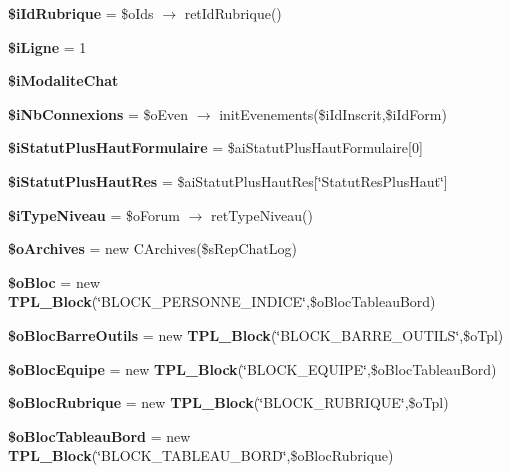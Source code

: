 \begin{CompactItemize}
\item 
\textbf{\$iIdRubrique} = \$oIds $\rightarrow$ retIdRubrique()\label{tableau__bord_8php_7e7c4458a7909f5b5d70084de05a2d8c}

\item 
\textbf{\$iLigne} = 1\label{tableau__bord_8php_fcbf9ca101fdc3384d3803689d92e4e4}

\item 
\textbf{\$iModaliteChat}
\item 
\textbf{\$iNbConnexions} = \$oEven $\rightarrow$ initEvenements(\$iIdInscrit,\$iIdForm)\label{tableau__bord_8php_7ac24b12bd0d7e2cf151eaf282f806c6}

\item 
\textbf{\$iStatutPlusHautFormulaire} = \$aiStatutPlusHautFormulaire[0]\label{tableau__bord_8php_92d4b8ea89f93a7fdb8f1607d749599f}

\item 
\textbf{\$iStatutPlusHautRes} = \$aiStatutPlusHautRes[\char`\"{}StatutResPlusHaut\char`\"{}]\label{tableau__bord_8php_24aae0e27da3a6d4263dd97eef6c88c9}

\item 
\textbf{\$iTypeNiveau} = \$oForum $\rightarrow$ retTypeNiveau()\label{tableau__bord_8php_9ca83d7d15b877e382bbb453e5459ef0}

\item 
\textbf{\$oArchives} = new CArchives(\$sRepChatLog)\label{tableau__bord_8php_95ed803d11eebb0ab86f24a284d1e5db}

\item 
\textbf{\$oBloc} = new {\bf TPL\_\-Block}(\char`\"{}BLOCK\_\-PERSONNE\_\-INDICE\char`\"{},\$oBlocTableauBord)\label{tableau__bord_8php_d210a4d2f043e797de79c9d657e75a58}

\item 
\textbf{\$oBlocBarreOutils} = new {\bf TPL\_\-Block}(\char`\"{}BLOCK\_\-BARRE\_\-OUTILS\char`\"{},\$oTpl)\label{tableau__bord_8php_77d79a88a29952705bd65ce7ce0e7686}

\item 
\textbf{\$oBlocEquipe} = new {\bf TPL\_\-Block}(\char`\"{}BLOCK\_\-EQUIPE\char`\"{},\$oBlocTableauBord)\label{tableau__bord_8php_7820f950ae68247a0e345bced4b81ce8}

\item 
\textbf{\$oBlocRubrique} = new {\bf TPL\_\-Block}(\char`\"{}BLOCK\_\-RUBRIQUE\char`\"{},\$oTpl)\label{tableau__bord_8php_b7f595d3192a04822b37aefca1472a4e}

\item 
\textbf{\$oBlocTableauBord} = new {\bf TPL\_\-Block}(\char`\"{}BLOCK\_\-TABLEAU\_\-BORD\char`\"{},\$oBlocRubrique)\label{tableau__bord_8php_4beef6d7d0ed3103654d1d13f4aa087a}


\end{CompactItemize}
